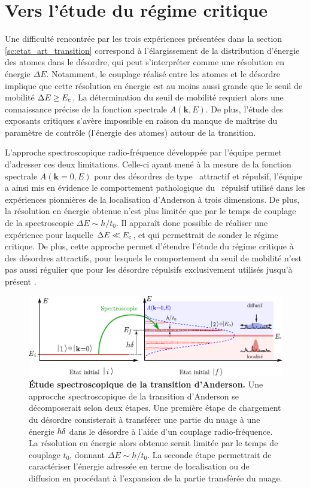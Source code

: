 \section{Vers l'étude du régime critique}
Une difficulté rencontrée par les trois expériences présentées dans la section \ref{sc:etat_art_transition} correspond à l'élargissement de la distribution d'énergie des atomes dans le désordre, qui peut s'interpréter comme une résolution en énergie $\Delta E$. Notamment, le couplage réalisé entre les atomes et le désordre implique que cette résolution en énergie est au moins aussi grande que le seuil de mobilité $\Delta E \geq E_{\mathrm{c}}$. La détermination du seuil de mobilité requiert alors une connaissance précise de la fonction spectrale $A(\mathbf{k},E)$. De plus, l'étude des exposants critiques s'avère impossible en raison du manque de maîtrise du paramètre de contrôle (l'énergie des atomes) autour de la transition. 

L'approche spectroscopique radio-fréquence développée par l'équipe permet d'adresser ces deux limitations. Celle-ci ayant mené à la mesure de la fonction spectrale $A(\mathbf{k}=0,E)$ pour des désordres de type \speckle\ attractif et répulsif, l'équipe a ainsi mis en évidence le comportement pathologique du \speckle\ répulsif utilisé dans les expériences pionnières de la localisation d'Anderson à trois dimensions. De plus, la résolution en énergie obtenue n'est plus limitée que par le temps de couplage de la spectroscopie $\Delta E \sim h/t_0$. Il apparaît donc possible de réaliser une expérience pour laquelle $\Delta E \ll E_{\mathrm{c}}$, et qui permettrait de sonder le régime critique. De plus, cette approche permet d'étendre l'étude du régime critique à des désordres attractifs, pour lesquels le comportement du seuil de mobilité n'est pas aussi régulier que pour les désordre répulsifs exclusivement utilisés jusqu'à présent \citep{delande2014mobility}.

\begin{figure}
\centering
\includegraphics[width=\textwidth]{Fig/Conclusion/spectro_transition_anderson.pdf}
\caption{\textbf{Étude spectroscopique de la transition d'Anderson.} Une approcche spectroscopique de la transition d'Anderson se décomposerait selon deux étapes. Une première étape de chargement du désordre consisterait à transférer une partie du nuage à une énergie $\hslash\delta$ dans le désordre à l'aide d'un couplage radio-fréquence. La résolution en énergie alors obtenue serait limitée par le temps de couplage $t_0$, donnant $\Delta E \sim h/t_0$. La seconde étape permettrait de caractériser l'énergie adressée en terme de localisation ou de diffusion en procédant à l'expansion de la partie transférée du nuage.}
\label{fig:spectro_transition_anderson}
\end{figure}

